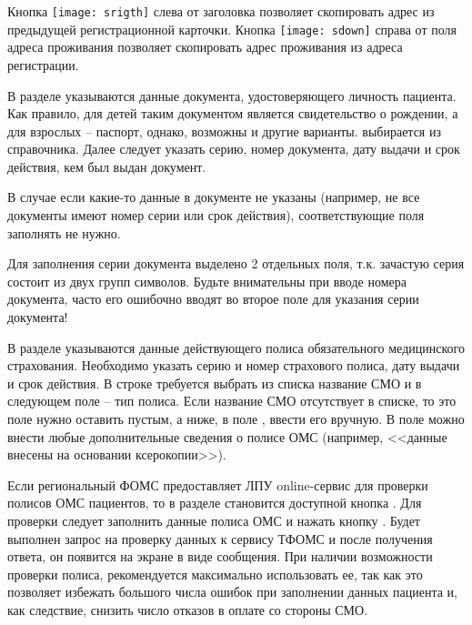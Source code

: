 \begin{prim}
Кнопка \texttt{[image: srigth]} слева от заголовка  позволяет скопировать адрес из предыдущей регистрационной карточки. Кнопка \texttt{[image: sdown]} справа от поля  адреса проживания позволяет скопировать адрес проживания из адреса регистрации.
\end{prim}

В разделе  указываются данные документа, удостоверяющего личность пациента. Как правило, для детей таким документом является свидетельство о рождении, а для взрослых – паспорт, однако, возможны и другие варианты.  выбирается из справочника. Далее следует указать серию, номер документа, дату выдачи и срок действия, кем был выдан документ.

В случае если какие-то данные в документе не указаны (например, не все документы имеют номер серии или срок действия), соответствующие поля заполнять не нужно.

\begin{vnim}
Для заполнения серии документа выделено 2 отдельных поля, т.к. зачастую серия состоит из двух групп символов. Будьте внимательны при вводе номера документа, часто его ошибочно вводят во второе поле для указания серии документа!
\end{vnim}
  
В разделе  указываются данные действующего полиса обязательного медицинского страхования. Необходимо указать серию и номер страхового полиса, дату выдачи и срок действия. В строке  требуется выбрать из списка название СМО и в следующем поле – тип полиса. Если название СМО отсутствует в списке, то это поле нужно оставить пустым, а ниже, в поле , ввести его вручную. В поле  можно внести любые дополнительные сведения о полисе ОМС (например, <<данные внесены на основании ксерокопии>>).

Если региональный ФОМС предоставляет ЛПУ online-сервис для проверки полисов ОМС пациентов, то в разделе  становится доступной кнопка . Для проверки следует заполнить данные полиса ОМС и нажать кнопку . Будет выполнен запрос на проверку данных к сервису ТФОМС и после получения ответа, он появится на экране в виде сообщения. При наличии возможности проверки полиса, рекомендуется максимально использовать ее, так как это позволяет избежать большого числа ошибок при заполнении данных пациента и, как следствие, снизить число отказов в оплате со стороны СМО.

